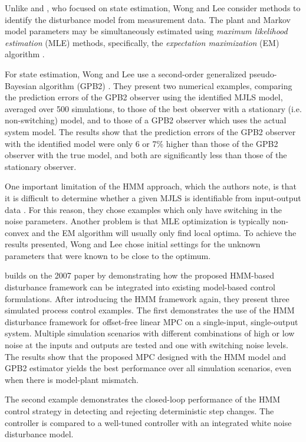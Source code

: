 Unlike \cite{robertson_detection_1995} and \cite{eriksson_classification_1996}, who focused on state estimation, Wong and Lee consider methods to identify the disturbance model from measurement data. The plant and Markov model parameters may be simultaneously estimated using \textit{maximum likelihood estimation} (MLE) methods, specifically, the \textit{expectation maximization} (EM) algorithm \citep{dempster_maximum_1977}.

For state estimation, Wong and Lee use a second-order generalized pseudo-Bayesian algorithm (GPB2)  \citep{bar-shalom_estimation_1993}. They present two numerical examples, comparing the prediction errors of the GPB2 observer using the identified MJLS model, averaged over 500 simulations, to those of the best observer with a stationary (i.e. non-switching) model, and to those of a GPB2 observer which uses the actual system model.  The results show that the prediction errors of the GPB2 observer with the identified model were only 6 or 7\% higher than those of the GPB2 observer with the true model, and both are significantly less than those of the stationary observer.

One important limitation of the HMM approach, which the authors note, is that it is difficult to determine whether a given MJLS is identifiable from input-output data \citep{vidal_observability_2002}. For this reason, they chose examples which only have switching in the noise parameters. Another problem is that MLE optimization is typically non-convex and the EM algorithm will usually only find local optima. To achieve the results presented, Wong and Lee chose initial settings for the unknown parameters that were known to be close to the optimum.

\cite{wong_realistic_2009} builds on the 2007 paper by demonstrating how the proposed HMM-based disturbance framework can be integrated into existing model-based control formulations. After introducing the HMM framework again, they present three simulated process control examples. The first demonstrates the use of the HMM disturbance framework for offset-free linear MPC on a single-input, single-output system. Multiple simulation scenarios with different combinations of high or low noise at the inputs and outputs are tested and one with switching noise levels. The results show that the proposed MPC designed with the HMM model and GPB2 estimator yields the best performance over all simulation scenarios, even when there is model-plant mismatch.

The second example demonstrates the closed-loop performance of the HMM control strategy in detecting and rejecting deterministic step changes. The controller is compared to a well-tuned controller with an integrated white noise disturbance model.

